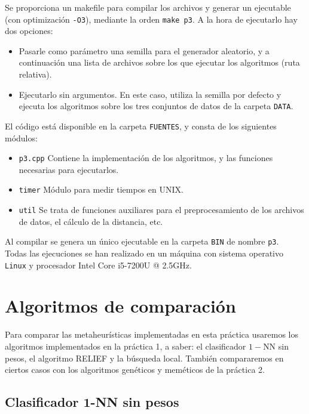 \documentclass[12pt]{article}
\begin{document}
Se proporciona un makefile para compilar los archivos y generar un ejecutable (con optimización \verb|-O3|), mediante la orden \verb|make p3|. A la hora de ejecutarlo hay dos opciones:

\begin{itemize}
    \item Pasarle como parámetro una semilla para el generador aleatorio, y a continuación una lista de archivos sobre los que ejecutar los algoritmos (ruta relativa).
    \item Ejecutarlo sin argumentos. En este caso, utiliza la semilla por defecto y ejecuta los algoritmos sobre los tres conjuntos de datos de la carpeta \verb|DATA|.
\end{itemize}

El código está disponible en la carpeta \verb|FUENTES|, y consta de los siguientes módulos:

\begin{itemize}
	\item \verb|p3.cpp| Contiene la implementación de los algoritmos, y las funciones necesarias para ejecutarlos.
	\item \verb|timer| Módulo para medir tiempos en UNIX.
	\item \verb|util| Se trata de funciones auxiliares para el preprocesamiento de los archivos de datos, el cálculo de la distancia, etc.
\end{itemize}

Al compilar se genera un único ejecutable en la carpeta \verb|BIN| de nombre \verb|p3|.\\

Todas las ejecuciones se han realizado en un máquina con sistema operativo \verb|Linux| y procesador Intel Core i5-7200U @ 2.5GHz.

\newpage
\section{Algoritmos de comparación}

Para comparar las metaheurísticas implementadas en esta práctica usaremos los algoritmos implementados en la práctica 1, a saber: el clasificador $1-$NN sin pesos, el algoritmo RELIEF y la búsqueda local. También compararemos en ciertos casos con los algoritmos genéticos y meméticos de la práctica 2.

\subsection*{{\color{red} Clasificador $\mathbf{1}$-NN sin pesos}}
\end{document}
